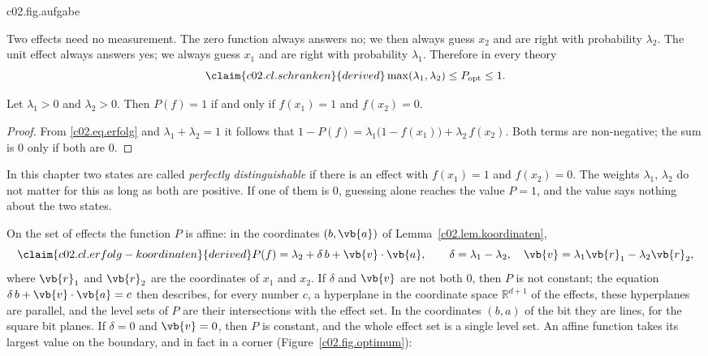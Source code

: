 \begin{tpcfigure}{c02.fig.aufgabe}
  \caption{The task. Left: $x_1$ or $x_2$ is prepared, then the question $f$ is asked and the guess follows the answer. Right: the probabilities of the four possible cases, in the upper row for the answer yes, in the lower row for no. In the two cases with the heavy frame the guess is right; their sum is $P(f)$ of equation~\eqref{c02.eq.erfolg}.}
\end{tpcfigure}

Two effects need no measurement. The zero function always answers no; we then always guess
$x_2$ and are right with probability $\lambda_2$. The unit effect always answers yes; we
always guess $x_1$ and are right with probability $\lambda_1$. Therefore in every theory
\begin{equation}\label{c02.eq.schranken}\claim{c02.cl.schranken}{derived}
  \max(\lambda_1, \lambda_2) \leq P_{\mathrm{opt}} \leq 1 .
\end{equation}

\begin{proposition}\label{c02.prop.perfekt}
  Let $\lambda_1 > 0$ and $\lambda_2 > 0$. Then $P(f) = 1$ if and only if $f(x_1) = 1$ and
  $f(x_2) = 0$.
\end{proposition}
\begin{proof}
  From \eqref{c02.eq.erfolg} and $\lambda_1 + \lambda_2 = 1$ it follows that
  $1 - P(f) = \lambda_1\bigl(1 - f(x_1)\bigr) + \lambda_2\, f(x_2)$. Both terms are
  non-negative; the sum is $0$ only if both are $0$.
\end{proof}

In this chapter two states are called \emph{perfectly distinguishable} if there is an
effect with $f(x_1) = 1$ and $f(x_2) = 0$. The weights $\lambda_1$, $\lambda_2$ do not
matter for this as long as both are positive. If one of them is $0$, guessing alone
reaches the value $P = 1$, and the value says nothing about the two states.

On the set of effects the function $P$ is affine: in the coordinates $(b, \vb{a})$ of
Lemma~\ref{c02.lem.koordinaten},
\begin{equation}\label{c02.eq.erfolg-koordinaten}\claim{c02.cl.erfolg-koordinaten}{derived}
  P(f) = \lambda_2 + \delta\, b + \vb{v}\cdot\vb{a},
  \qquad \delta = \lambda_1 - \lambda_2, \quad \vb{v} = \lambda_1 \vb{r}_1 - \lambda_2 \vb{r}_2 ,
\end{equation}
where $\vb{r}_1$ and $\vb{r}_2$ are the coordinates of $x_1$ and $x_2$. If $\delta$
and $\vb{v}$ are not both $0$, then $P$ is not constant; the equation
$\delta\, b + \vb{v}\cdot\vb{a} = c$ then describes, for every number $c$, a hyperplane in
the coordinate space $\mathbb{R}^{d+1}$ of the effects, these hyperplanes are parallel, and
the level sets of $P$ are their intersections with the effect set. In the coordinates
$(b, a)$ of the bit they are lines, for the square bit planes. If $\delta = 0$ and
$\vb{v} = 0$, then $P$ is constant, and the whole effect set is a single level set. An
affine function takes its largest value
on the boundary, and in fact in a corner
(Figure~\ref{c02.fig.optimum}):

